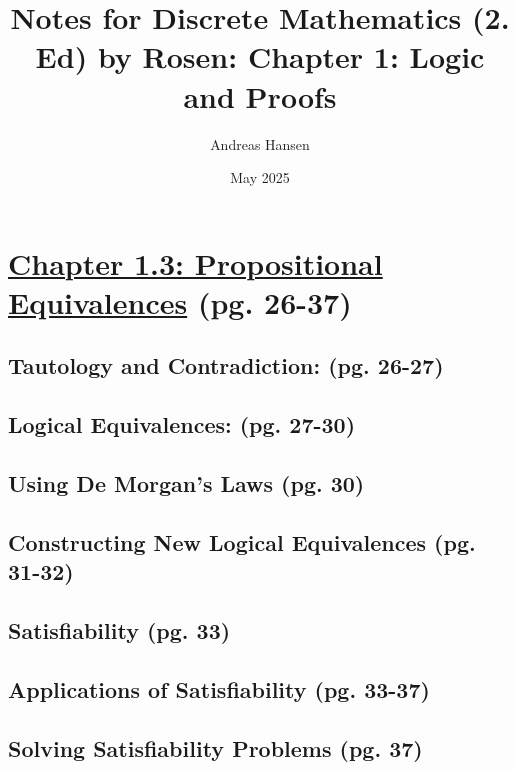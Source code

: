 \documentclass{article}
\title{Notes for Discrete Mathematics (2. Ed) by Rosen: Chapter 1: Logic and Proofs}
\author{Andreas Hansen}
\date{May 2025}
\numberwithin{equation}{section}
\numberwithin{equation}{subsection}
\begin{document}
\maketitle

\section*{\underline{Chapter 1.3: Propositional Equivalences} (pg. 26-37)}
\subsection*{Tautology and Contradiction: (pg. 26-27)}

\newpage
\subsection*{Logical Equivalences: (pg. 27-30)}

\subsection*{Using De Morgan’s Laws (pg. 30)}

\newpage
\subsection*{Constructing New Logical Equivalences (pg. 31-32)}

\subsection*{Satisfiability (pg. 33)}

\newpage
\subsection*{Applications of Satisfiability (pg. 33-37)}

\newpage
\subsection*{Solving Satisfiability Problems (pg. 37)}

\end{document}
